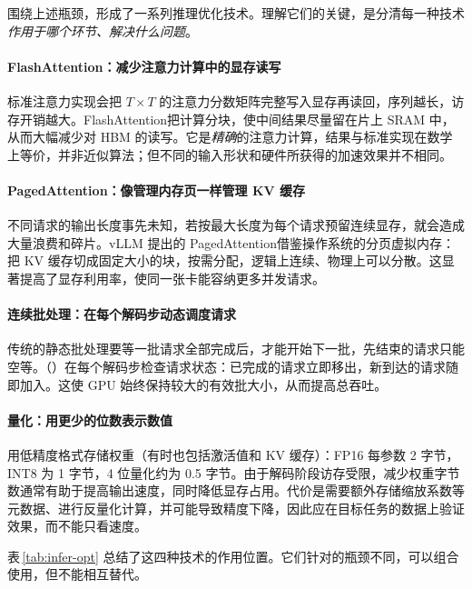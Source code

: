 围绕上述瓶颈，形成了一系列推理优化技术。理解它们的关键，是分清每一种技术\emph{作用于哪个环节、解决什么问题}。

\paragraph{FlashAttention：减少注意力计算中的显存读写} 标准注意力实现会把 $T\times T$ 的注意力分数矩阵完整写入显存再读回，序列越长，访存开销越大。FlashAttention\cite{dao2022flashattention}把计算分块，使中间结果尽量留在片上 SRAM 中，从而大幅减少对 HBM 的读写。它是\emph{精确}的注意力计算，结果与标准实现在数学上等价，并非近似算法；但不同的输入形状和硬件所获得的加速效果并不相同。

\paragraph{PagedAttention：像管理内存页一样管理 KV 缓存} 不同请求的输出长度事先未知，若按最大长度为每个请求预留连续显存，就会造成大量浪费和碎片。vLLM 提出的 PagedAttention\cite{kwon2023vllm}借鉴操作系统的分页虚拟内存：把 KV 缓存切成固定大小的块，按需分配，逻辑上连续、物理上可以分散。这显著提高了显存利用率，使同一张卡能容纳更多并发请求。

\paragraph{连续批处理：在每个解码步动态调度请求} 传统的静态批处理要等一批请求全部完成后，才能开始下一批，先结束的请求只能空等。（）\cite{yu2022orca}在每个解码步检查请求状态：已完成的请求立即移出，新到达的请求随即加入。这使 GPU 始终保持较大的有效批大小，从而提高总吞吐。

\paragraph{量化：用更少的位数表示数值} 用低精度格式存储权重（有时也包括激活值和 KV 缓存）：FP16 每参数 2 字节，INT8 为 1 字节，4 位量化约为 0.5 字节。由于解码阶段访存受限，减少权重字节数通常有助于提高输出速度，同时降低显存占用。代价是需要额外存储缩放系数等元数据、进行反量化计算，并可能导致精度下降，因此应在目标任务的数据上验证效果，而不能只看速度\cite{dettmers2023qlora}。

表\,\ref{tab:infer-opt} 总结了这四种技术的作用位置。它们针对的瓶颈不同，可以组合使用，但不能相互替代。

